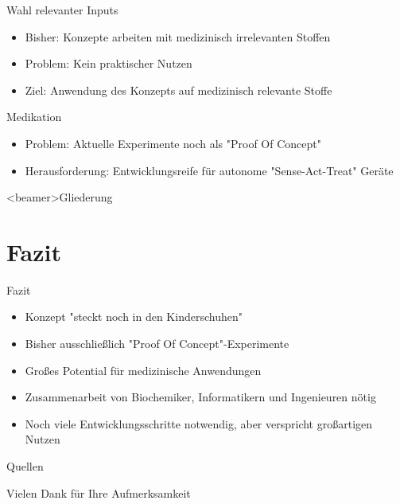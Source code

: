\documentclass{beamer}
\begin{document}
	\begin{frame}{Wahl relevanter Inputs}		
		\begin{itemize}	
			\item Bisher: Konzepte arbeiten mit medizinisch irrelevanten Stoffen 
			\item Problem: Kein praktischer Nutzen
			\item Ziel: Anwendung des Konzepts auf medizinisch relevante Stoffe
			
		\end{itemize}
	\end{frame}

	\begin{frame}{Medikation}
		\begin{itemize}
			\item Problem: Aktuelle Experimente noch als "Proof Of Concept"
			\item Herausforderung: Entwicklungsreife f\"ur autonome "Sense-Act-Treat" Ger\"ate
		\end{itemize}
	\end{frame}

 	\begin{frame}<beamer>{Gliederung}
 	\tableofcontents
	\end{frame}

   \section{Fazit}
   \begin{frame}{Fazit}
   		\begin{itemize}
   			\item Konzept "steckt noch in den Kinderschuhen"
   			\item Bisher ausschlie\ss{}lich "Proof Of Concept"-Experimente
   			\item Gro\ss{}es Potential f\"ur medizinische Anwendungen
   			\item Zusammenarbeit von Biochemiker, Informatikern und Ingenieuren n\"otig
   			\item Noch viele Entwicklungsschritte notwendig, aber verspricht gro\ss{}artigen Nutzen
   		\end{itemize}
   \end{frame}
   
   
   
	\appendix
	\begin{frame}[allowframebreaks]{Quellen}
	\nocite{*}
	
	

	\end{frame}
    
    
\begin{frame}[focus]
Vielen Dank f{\"u}r Ihre Aufmerksamkeit
\end{frame}
   
\end{document}
